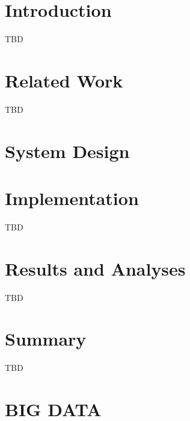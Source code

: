 \documentclass{sig-alternate}
\begin{document}
 
 
 
\section{Introduction} 

\cite{las12fg-bookchapter}

\cite{las2010gce}

TBD 
 
 
\section{Related Work} \label{S:related}
 
TBD 

 
\section{System Design} \label{S:design}
 
  
 
\section{Implementation} \label{S:implementation}

TBD
\section{Results and Analyses} \label{S:result}

TBD
 
 
\section{Summary}

TBD 


\section{BIG DATA}
\end{document}

